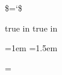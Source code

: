 \def\line{\hbox to\hsize}
\def\leftline#1{\line{#1\hss}}
\def\centerline#1{\line{\hss#1\hss}}
\def\rightline#1{\line{\hss#1}}

%
%

\def\dots{...}
\def\thinspace{\hbox{ }}
\def\'#1{{\accent"13 #1}}
\chardef\$=`\$
\def\copyright{{\sym\char"A9}}

\def\emph#1{{\it #1\/}}

%
%

\gdef\definefontexpandability{\pdffontexpand\font 30 30 10 autoexpand}

%
%

\pdfhorigin=0pt
\pdfvorigin=0pt

 true in   %
 true in  %

\hsize=22pc               %
\vsize=39pc               %
\voffset=4.5pc            %
\setspinemargin{4.5pc}    %

\output{\facingpages}

\raggedbottom

\parindent=1em
\emergencystretch=1.5em

\leading=15pt
\normalbaselineskip=\leading
\normalbaselines

\leading %

\leading %

